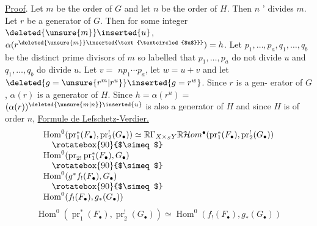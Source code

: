 \uline{Proof}. Let $m$ be the order of $G$ and let $n$ be the order
of $H$. Then $n$ ' divides $m$. Let $r$ be a generator of $G$. Then
for some integer $\deleted{\unsure{m}}\inserted{u}$, $\alpha(r^{\deleted{\unsure{m}}\inserted{\text{\textcircled{$u$}}}})=h$. Let $p_1,\ldots,p_a,q_1,\ldots,q_b$
be the distinct prime divisors of $m$ so labelled that $p_1,\ldots,p_a$
do not divide $u$ and $q_1,\ldots,q_b$ do divide $u$. Let $v=$
$np_1\cdots p_a$, let $w=u+v$ and let $\deleted{g=\unsure{r^m|r^u}}\inserted{g=r^w}$. Since $r$ is a gen-
erator of $G$, $\alpha(r)$ is a generator of $H$. Since $h=\alpha(r^u)=$
$(\alpha(r))^{\deleted{\unsure{m|n}}\inserted{u}}$ is also a generator of $H$ and since $H$ is of order $n$,
\uline{Formule de Lefschetz-Verdier.}
\[
\begin{array}{l}
\operatorname{Hom}^0(\operatorname{pr}_1^*(F_\bullet),\operatorname{pr}_2^!(G_\bullet))\simeq\mathbb R\Gamma_{X\times_S Y}\mathbb R\mathcal Hom^\bullet(\operatorname{pr}_1^*(F_\bullet),\operatorname{pr}_2^!(G_\bullet))\\
\quad\rotatebox{90}{$\simeq$}\\
\operatorname{Hom}^0(\operatorname{pr}_{2!}\operatorname{pr}_1^*(F_\bullet),G_\bullet)\\
\quad\rotatebox{90}{$\simeq$}\\
\operatorname{Hom}^0(g^*f_!(F_\bullet),G_\bullet)\\
\quad\rotatebox{90}{$\simeq$}\\
\operatorname{Hom}^0(f_!(F_\bullet),g_*(G_\bullet))
\end{array}
\]
\[
\operatorname{Hom}^0(\operatorname{pr}_1^*(F_\bullet),\operatorname{pr}_2^!(G_\bullet))\simeq\operatorname{Hom}^0(f_!(F_\bullet),g_*(G_\bullet))
\]
